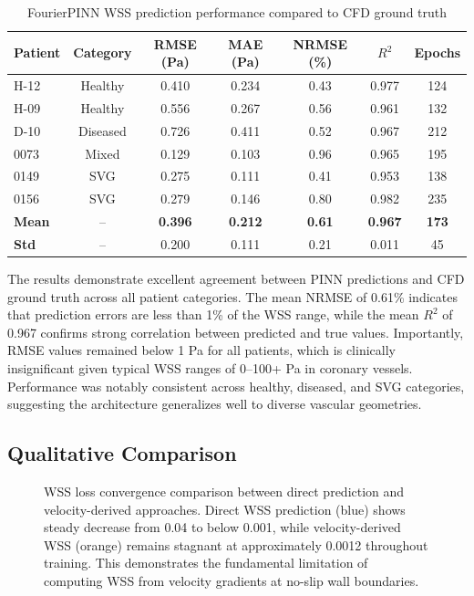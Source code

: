 \documentclass[12pt,a4paper]{article}
\begin{document}
\begin{table}[htbp]
\centering
\caption{FourierPINN WSS prediction performance compared to CFD ground truth}
\label{tab:results}
\begin{tabular}{lcccccc}
\toprule
\textbf{Patient} & \textbf{Category} & \textbf{RMSE (Pa)} & \textbf{MAE (Pa)} & \textbf{NRMSE (\%)} & \textbf{$R^2$} & \textbf{Epochs} \\
\midrule
H-12 & Healthy & 0.410 & 0.234 & 0.43 & 0.977 & 124 \\
H-09 & Healthy & 0.556 & 0.267 & 0.56 & 0.961 & 132 \\
D-10 & Diseased & 0.726 & 0.411 & 0.52 & 0.967 & 212 \\
0073 & Mixed & 0.129 & 0.103 & 0.96 & 0.965 & 195 \\
0149 & SVG & 0.275 & 0.111 & 0.41 & 0.953 & 138 \\
0156 & SVG & 0.279 & 0.146 & 0.80 & 0.982 & 235 \\
\midrule
\textbf{Mean} & -- & \textbf{0.396} & \textbf{0.212} & \textbf{0.61} & \textbf{0.967} & \textbf{173} \\
\textbf{Std} & -- & 0.200 & 0.111 & 0.21 & 0.011 & 45 \\
\bottomrule
\end{tabular}
\end{table}

The results demonstrate excellent agreement between PINN predictions and CFD ground truth across all patient categories. The mean NRMSE of 0.61\% indicates that prediction errors are less than 1\% of the WSS range, while the mean $R^2$ of 0.967 confirms strong correlation between predicted and true values. Importantly, RMSE values remained below 1 Pa for all patients, which is clinically insignificant given typical WSS ranges of 0--100+ Pa in coronary vessels. Performance was notably consistent across healthy, diseased, and SVG categories, suggesting the architecture generalizes well to diverse vascular geometries.

\subsection{Qualitative Comparison}

\begin{figure}[htbp]
\centering
\caption{WSS loss convergence comparison between direct prediction and velocity-derived approaches. Direct WSS prediction (blue) shows steady decrease from 0.04 to below 0.001, while velocity-derived WSS (orange) remains stagnant at approximately 0.0012 throughout training. This demonstrates the fundamental limitation of computing WSS from velocity gradients at no-slip wall boundaries.}
\label{fig:wss_convergence_comparison}
\end{figure}
\end{document}
